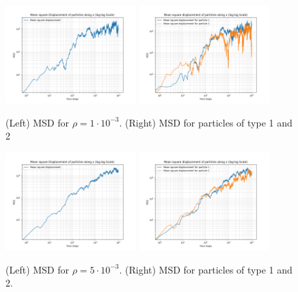 \begin{figure}[ht]
    \centering
    \includegraphics[width=0.45\textwidth]{FIG/ex13/MSD_particle_number10.png} 
    \hspace{0.05\textwidth}
    \includegraphics[width=0.45\textwidth]{FIG/ex13/MSD_particle_number10_particle1.png}
    \caption{(Left) MSD for $\rho = 1\cdot 10^{-3}$. (Right) MSD for particles of type 1 and 2}
    \label{fig:combined2}
\end{figure}

\begin{figure}[ht]
    \centering
    \includegraphics[width=0.45\textwidth]{FIG/ex13/MSD_particle_number50.png} 
    \hspace{0.05\textwidth}
    \includegraphics[width=0.45\textwidth]{FIG/ex13/MSD_particle_number50_particle1.png}
    \caption{(Left) MSD for $\rho = 5\cdot 10^{-3}$. (Right) MSD for particles of type 1 and 2.}
    \label{fig:combined3}
\end{figure}

